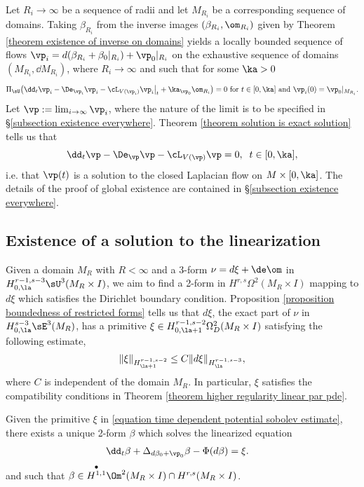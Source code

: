\documentclass[hidelinks, 12pt, oneside, reqno]{amsart}
\begin{document}
Let $R_i \rightarrow \infty$ be a sequence of radii and let $M_{R_i}$ be a corresponding sequence of domains. Taking $\beta_{R_i}$ from the inverse images $(\beta_{R_i},\om_{R_i})$ given by Theorem \ref{theorem existence of inverse on domains} yields a locally bounded sequence of flows $\vp_i = d(\beta_{R_i} + \beta_0|_{R_i}) + \vp_0|_{R_i}$ on the exhaustive sequence of domains $(M_{R_i}, \dd M_{R_i})$, where $R_i \rightarrow \infty$ and such that for some $\ka > 0$
\[
\Pi_{\sU}\big(\dd_t \vp_i - \De_{\vp_i}\vp_i - \cL_{V(\vp_i)}\vp_i\big|_t  + \ka_{\vp_0} \om_{R_i}\big) = 0 \text{ for } t \in [0, \ka] \text{ and } \vp_i(0) = \vp_0|_{M_{R_i}}.
\]
Let $\vp := \lim_{i\rightarrow \infty} \vp_i$, where the nature of the limit is to be specified in \S \ref{subsection existence everywhere}. Theorem \ref{theorem solution is exact solution} tells us that
\[
\dd_t \vp - \De_{\vp}\vp - \cL_{V(\vp )}\vp = 0, \;\;t \in [0, \ka],
\]
i.e. that $\vp(t)$ is a solution to the closed Laplacian flow on $M \times [0,\ka]$. The details of the proof of global existence are contained in \S \ref{subsection existence everywhere}.  

\subsection{Existence of a solution to the linearization}\label{subsection existence of solution to linearization}\label{subsection parabolic existence}

Given a domain $M_R$ with $R< \infty$ and a 3-form $\nu = d\xi + \de \om$ in $H^{r-1, s-3}_{0,\la}\sU^3(M_R \times I)$, we aim to find a 2-form in $H^{r,s} \Omega^2(M_R \times I)$ mapping to $d \xi$ which satisfies the Dirichlet boundary condition. Proposition \ref{proposition boundedness of restricted forms} tells us that $d\xi$, the exact part of $\nu$ in $H^{s-3}_{0,\la}\sE^3(M_R)$, has a primitive $\xi \in H_{0,\la+1}^{r-1,s-2}\Omega_D^2(M_R \times I)$ satisfying the following estimate,
\begin{align}\label{equation time dependent potential sobolev estimate}
\|\xi\|_{H^{r-1, s-2}_{\la+1}} \le C \|d\xi\|_{H^{r-1, s-3}_{\la}},
\end{align}
where $C$ is independent of the domain $M_R$. In particular, $\xi$ satisfies the compatibility conditions in Theorem \ref{theorem higher regularity linear par pde}.

\begin{prop}\label{proposition unique solution sufficient regularity}
Given the primitive $\xi$ in \eqref{equation time dependent potential sobolev estimate}, there exists a unique 2-form $\beta$ which solves the linearized equation
\begin{align}
    \dd_t \beta + \Delta_{d\beta_0 + \vp_0} \beta - \Phi(d\beta) &= \xi.  \label{equation linearized LF potential}
\end{align}
and such that $\beta \in \overset{\bullet}{H^{1,1}}\Om^2 (M_R \times I) \cap H^{r,s}(M_R \times I)$.
\end{prop}
\end{document}
